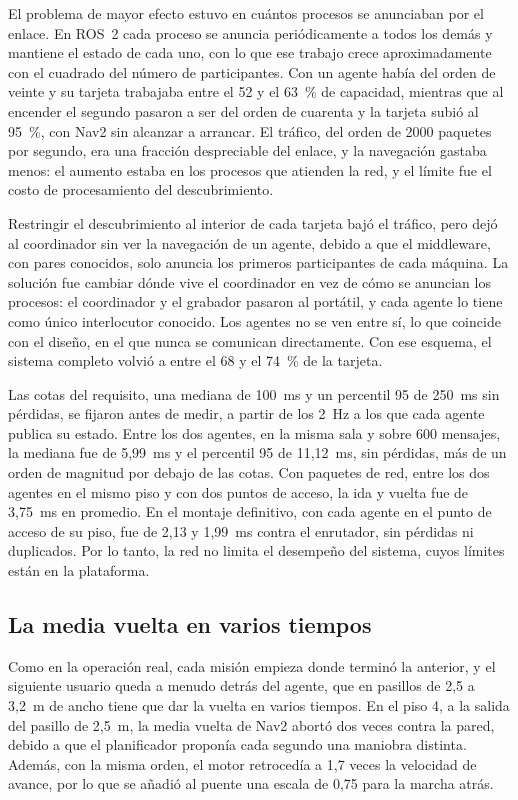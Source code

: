 El problema de mayor efecto estuvo en cuántos procesos se anunciaban por el enlace. En ROS~2 cada proceso se anuncia periódicamente a todos los demás y mantiene el estado de cada uno, con lo que ese
trabajo crece aproximadamente con el cuadrado del número de participantes. Con un agente había del orden de veinte y su tarjeta trabajaba entre el 52 y el 63~\% de capacidad, mientras que al encender el
segundo pasaron a ser del orden de cuarenta y la tarjeta subió al 95~\%, con Nav2 sin alcanzar a arrancar. El tráfico, del orden de 2000 paquetes por segundo, era una fracción despreciable del enlace, y la
navegación gastaba menos: el aumento estaba en los procesos que atienden la red, y el límite fue el costo de procesamiento del descubrimiento.

Restringir el descubrimiento al interior de cada tarjeta bajó el tráfico, pero dejó al coordinador sin ver la navegación de un agente, debido a que el middleware, con pares conocidos, solo anuncia los
primeros participantes de cada máquina. La solución fue cambiar dónde vive el coordinador en vez de cómo se anuncian los procesos: el coordinador y el grabador pasaron al portátil, y cada agente lo tiene como
único interlocutor conocido. Los agentes no se ven entre sí, lo que coincide con el diseño, en el que nunca se comunican directamente. Con ese esquema, el sistema completo volvió a entre el 68 y el 74~\% de la
tarjeta.

Las cotas del requisito, una mediana de 100~ms y un percentil 95 de 250~ms sin pérdidas, se fijaron antes de medir, a partir de los 2~Hz a los que cada agente publica su estado. Entre los dos agentes, en la
misma sala y sobre 600 mensajes, la mediana fue de 5,99~ms y el percentil 95 de 11,12~ms, sin pérdidas, más de un orden de magnitud por debajo de las cotas. Con paquetes de red, entre los dos agentes en el
mismo piso y con dos puntos de acceso, la ida y vuelta fue de 3,75~ms en promedio. En el montaje definitivo, con cada agente en el punto de acceso de su piso, fue de 2,13 y 1,99~ms contra el enrutador, sin
pérdidas ni duplicados. Por lo tanto, la red no limita el desempeño del sistema, cuyos límites están en la plataforma.

\subsection{La media vuelta en varios tiempos}
\label{sec:media-vuelta}

Como en la operación real, cada misión empieza donde terminó la anterior, y el siguiente usuario queda a menudo detrás del agente, que en pasillos de 2,5 a 3,2~m de ancho tiene que dar la vuelta en varios
tiempos. En el piso 4, a la salida del pasillo de 2,5~m, la media vuelta de Nav2 abortó dos veces contra la pared, debido a que el planificador proponía cada segundo una maniobra distinta. Además, con la misma
orden, el motor retrocedía a 1,7 veces la velocidad de avance, por lo que se añadió al puente una escala de 0,75 para la marcha atrás.

